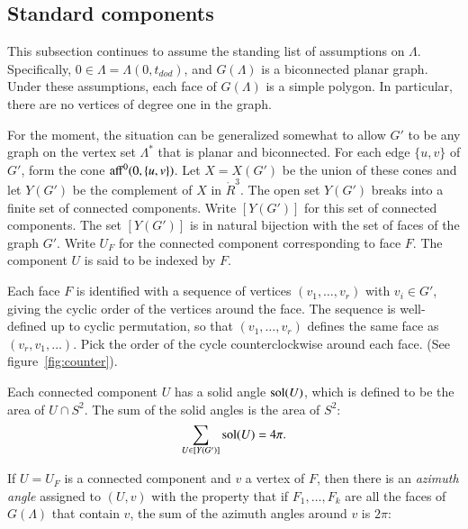 \documentclass{article} %
\begin{document}
\subsection{Standard components}

This subsection continues to assume the standing list of assumptions
on $\Lambda$. Specifically, $0\in\Lambda = \Lambda(0,t_{dod})$, and
$G(\Lambda)$ is a biconnected planar graph. Under these assumptions,
each face of $G(\Lambda)$ is a simple polygon. In particular, there
are no vertices of degree one in the graph.

For the moment, the situation can be generalized somewhat to allow
$G'$ to be any graph on the vertex set $\Lambda^*$ that is planar and
biconnected. For each edge $\{u,v\}$ of $G'$, form the cone
${\operatorname{aff}}^0(0,\{u,v\})$. Let $X=X(G')$ be the union of these cones and
let $Y(G')$ be the complement of $X$ in $\ring{R}^3$. The open set
$Y(G')$ breaks into a finite set of connected components. Write
$[Y(G')]$ for this set of connected components. The set $[Y(G')]$ is
in natural bijection with the set of faces of the graph $G'$. Write
$U_F$ for the connected component corresponding to face $F$. The
component $U$ is said to be indexed by $F$.

Each face $F$ is identified with a sequence of vertices
$(v_1,\ldots,v_r)$ with $v_i\in G'$, giving the cyclic order of the
vertices around the face. The sequence is well-defined up to cyclic
permutation, so that $(v_1,\ldots,v_r)$ defines the same face as
$(v_r,v_1,\ldots)$. Pick the order of the cycle counterclockwise
around each face.  (See figure~\ref{fig:counter}).


\begin{floatingfigure}{80mm}
  \begin{center}
   \end{center}
  \caption{}
\label{fig:counter}
\end{floatingfigure}

Each connected component $U$ has a solid angle $\operatorname{sol}(U)$, which
is defined to be the area of $U\cap S^2$.  The sum of the
solid angles is the area of $S^2$:
$$
\sum_{U\in[Y(G')]} \operatorname{sol}(U) = 4\pi.
$$

If $U=U_F$ is a connected component and $v$ a vertex of $F$, then there
is an {\it azimuth angle} assigned to $(U,v)$ with the property
that if $F_1,\ldots,F_k$ are all the faces of $G(\Lambda)$
that contain $v$, the sum of the azimuth angles around
$v$ is $2\pi$:
\end{document}
